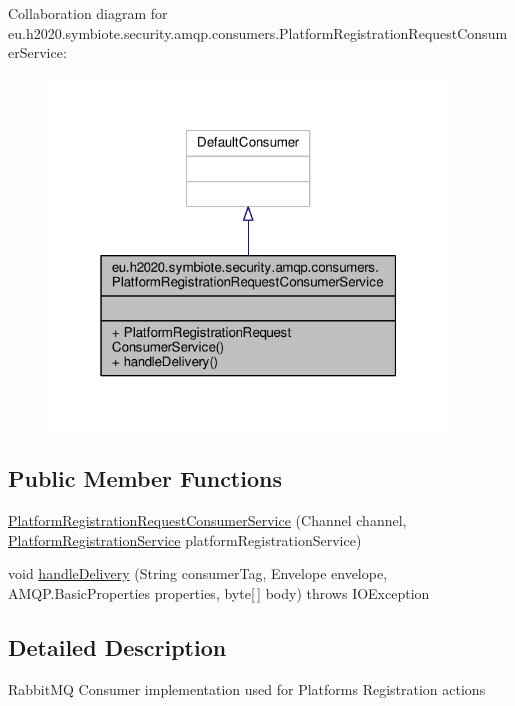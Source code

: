 Collaboration diagram for eu.\+h2020.\+symbiote.\+security.\+amqp.\+consumers.\+Platform\+Registration\+Request\+Consumer\+Service\+:
\nopagebreak
\begin{figure}[H]
\begin{center}
\leavevmode
\includegraphics[width=301pt]{classeu_1_1h2020_1_1symbiote_1_1security_1_1amqp_1_1consumers_1_1PlatformRegistrationRequestConsumerService__coll__graph}
\end{center}
\end{figure}
\subsection*{Public Member Functions}
\begin{DoxyCompactItemize}
\item 
\hyperlink{classeu_1_1h2020_1_1symbiote_1_1security_1_1amqp_1_1consumers_1_1PlatformRegistrationRequestConsumerService_ade7d1c51240268d9f63a02d5cb4faf5c}{Platform\+Registration\+Request\+Consumer\+Service} (Channel channel, \hyperlink{classeu_1_1h2020_1_1symbiote_1_1security_1_1services_1_1PlatformRegistrationService}{Platform\+Registration\+Service} platform\+Registration\+Service)
\item 
void \hyperlink{classeu_1_1h2020_1_1symbiote_1_1security_1_1amqp_1_1consumers_1_1PlatformRegistrationRequestConsumerService_a69334c874254fa8b50a3f7db6665aed8}{handle\+Delivery} (String consumer\+Tag, Envelope envelope, A\+M\+Q\+P.\+Basic\+Properties properties, byte\mbox{[}$\,$\mbox{]} body)  throws I\+O\+Exception 
\end{DoxyCompactItemize}


\subsection{Detailed Description}
Rabbit\+MQ Consumer implementation used for Platforms\textquotesingle{} Registration actions


